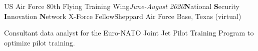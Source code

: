 \begin{rSubsection}{US Air Force 80th Flying Training Wing}{\em June-August 2020}{\textbf{N}ational \textbf{S}ecurity \textbf{I}nnovation \textbf{N}etwork X-Force Fellow}{Sheppard Air Force Base, Texas (virtual)}
\item Consultant data analyst for the Euro-NATO Joint Jet Pilot Training Program to optimize pilot training.
\end{rSubsection}